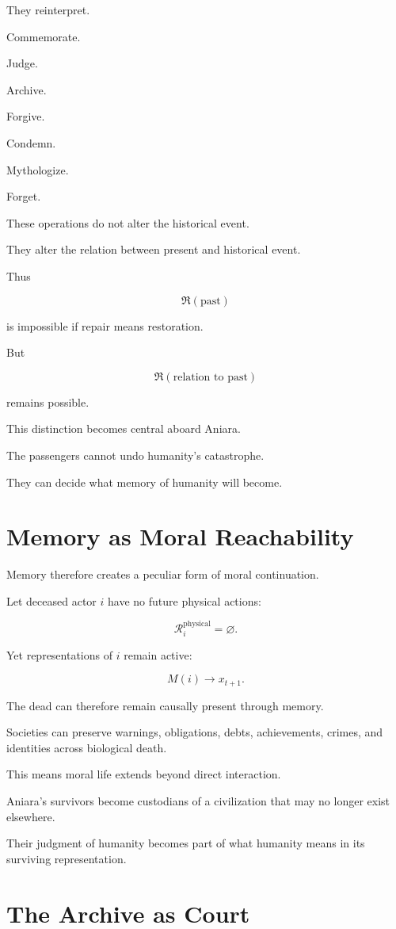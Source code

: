 \documentclass[11pt,oneside]{book}
\theoremstyle{definition}
\theoremstyle{remark}
\newcommand{\R}{\mathcal{R}}
\newcommand{\Repair}{\mathfrak{R}}
\begin{document}
They reinterpret.

Commemorate.

Judge.

Archive.

Forgive.

Condemn.

Mythologize.

Forget.

These operations do not alter the historical event.

They alter the relation between present and historical event.

Thus

\[
\Repair(\text{past})
\]

is impossible if repair means restoration.

But

\[
\Repair(\text{relation to past})
\]

remains possible.

This distinction becomes central aboard Aniara.

The passengers cannot undo humanity's catastrophe.

They can decide what memory of humanity will become.

\section{Memory as Moral Reachability}

Memory therefore creates a peculiar form of moral continuation.

Let deceased actor \(i\) have no future physical actions:

\[
\R_i^{\mathrm{physical}}=\varnothing.
\]

Yet representations of \(i\) remain active:

\[
M(i)\rightarrow x_{t+1}.
\]

The dead can therefore remain causally present through memory.

Societies can preserve warnings, obligations, debts, achievements, crimes, and identities across biological death.

This means moral life extends beyond direct interaction.

Aniara's survivors become custodians of a civilization that may no longer exist elsewhere.

Their judgment of humanity becomes part of what humanity means in its surviving representation.

\section{The Archive as Court}
\end{document}
